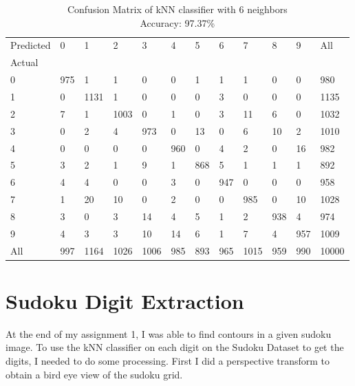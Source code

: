 \begin{table}[H]
    \centering
    \begin{tabular}{llllllllllll}
        Predicted & 0 & 1     & 2     & 3     & 4    & 5    & 6    & 7     & 8    & 9    & All    \\
        Actual &      &       &       &       &      &      &      &       &      &      &        \\
        0      &  975 &     1 &     1 &     0 &    0 &    1 &    1 &     1 &    0 &    0 &    980 \\
        1      &    0 &  1131 &     1 &     0 &    0 &    0 &    3 &     0 &    0 &    0 &   1135 \\
        2      &    7 &     1 &  1003 &     0 &    1 &    0 &    3 &    11 &    6 &    0 &   1032 \\
        3      &    0 &     2 &     4 &   973 &    0 &   13 &    0 &     6 &   10 &    2 &   1010 \\
        4      &    0 &     0 &     0 &     0 &  960 &    0 &    4 &     2 &    0 &   16 &    982 \\
        5      &    3 &     2 &     1 &     9 &    1 &  868 &    5 &     1 &    1 &    1 &    892 \\
        6      &    4 &     4 &     0 &     0 &    3 &    0 &  947 &     0 &    0 &    0 &    958 \\
        7      &    1 &    20 &    10 &     0 &    2 &    0 &    0 &   985 &    0 &   10 &   1028 \\
        8      &    3 &     0 &     3 &    14 &    4 &    5 &    1 &     2 &  938 &    4 &    974 \\
        9      &    4 &     3 &     3 &    10 &   14 &    6 &    1 &     7 &    4 &  957 &   1009 \\
        All    &  997 &  1164 &  1026 &  1006 &  985 &  893 &  965 &  1015 &  959 &  990 &  10000 \\
    \end{tabular}
    \caption*{Confusion Matrix of kNN classifier with 6 neighbors\\
    Accuracy: 97.37\%}
\end{table}


\newpage

\section*{Sudoku Digit Extraction}

At the end of my assignment 1, I was able to find contours in a given sudoku
image. To use the kNN classifier on each digit on the Sudoku Dataset to get the
digits, I needed to do some processing. First I did a perspective transform to
obtain a bird eye view of the sudoku grid. 

